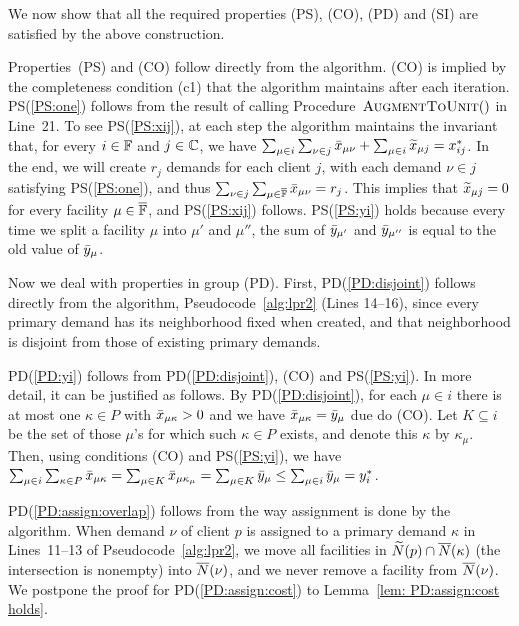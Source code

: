 \documentclass[11pt]{article}
\begin{document}

\medskip

  We now show that all the
required properties (PS), (CO), (PD) and (SI) are satisfied
by the above construction.

Properties~(PS) and (CO) follow directly from the
algorithm. (CO) is implied by the completeness condition
(c1) that the algorithm maintains after each
iteration. PS(\ref{PS:one}) follows from the result of
calling Procedure~${\textsc{AugmentToUnit}}()$ in Line~21. To see
PS(\ref{PS:xij}), at each step the algorithm maintains the
invariant that, for every $i\in\mathbb{F}$ and
$j\in\mathbb{C}$, we have $\sum_{\mu\in i}\sum_{\nu \in j}
{\bar x}_{\mu \nu} + \sum_{\mu\in i} {\widetilde x}_{\mu j} =
x_{ij}^\ast$. In the end, we will create $r_j$ demands for
each client $j$, with each demand $\nu\in j$ satisfying
PS(\ref{PS:one}), and thus $\sum_{\nu\in
  j}\sum_{\mu\in\overline{\mathbb{F}}}{\bar x}_{\mu\nu}=r_j$.  This
implies that ${\widetilde x}_{\mu j}=0$ for every facility
$\mu\in\overline{\mathbb{F}}$, and PS(\ref{PS:xij}) follows.
PS(\ref{PS:yi}) holds because every time we split a
facility $\mu$ into $\mu'$ and $\mu''$, the sum of
${\bar y}_{\mu'}$ and ${\bar y}_{\mu''}$ is equal to the old value of
${\bar y}_{\mu}$.

Now we deal with properties in group (PD).  First,
PD(\ref{PD:disjoint}) follows directly from the algorithm,
Pseudocode~\ref{alg:lpr2} (Lines 14--16), since every
primary demand has its neighborhood fixed when created, and
that neighborhood is disjoint from those of existing primary
demands.

PD(\ref{PD:yi}) follows from PD(\ref{PD:disjoint}), (CO) and
PS(\ref{PS:yi}). In more detail, it can be justified as
follows. By PD(\ref{PD:disjoint}), for each $\mu\in i$ there
is at most one $\kappa\in P$ with ${\bar x}_{\mu\kappa} > 0$
and we have ${\bar x}_{\mu\kappa} = {\bar y}_{\mu}$ due do (CO).
Let $K\subseteq i$ be the set of those $\mu$'s for which
such $\kappa\in P$ exists, and denote this $\kappa$ by
$\kappa_\mu$. Then, using conditions (CO) and
PS(\ref{PS:yi}), we have $ \sum_{\mu\in i}\sum_{\kappa\in
  P}{\bar x}_{\mu\kappa} = \sum_{\mu\in K}{\bar x}_{\mu\kappa_\mu}
= \sum_{\mu\in K}{\bar y}_{\mu} \leq \sum_{\mu\in i}
{\bar y}_{\mu} = y_i^\ast$.

PD(\ref{PD:assign:overlap}) follows from the way
assignment is done by the algorithm.  When demand $\nu$ of
client $p$ is assigned to a primary demand $\kappa$ in
Lines~11--13 of Pseudocode~\ref{alg:lpr2}, we move all
facilities in ${\widetilde N}(p)\cap {\overline{N}}(\kappa)$ (the
intersection is nonempty) into ${\overline{N}}(\nu)$, and we never
remove a facility from ${\overline{N}}(\nu)$.  We postpone the proof 
for PD(\ref{PD:assign:cost}) to Lemma~\ref{lem: PD:assign:cost holds}.
\end{document}
